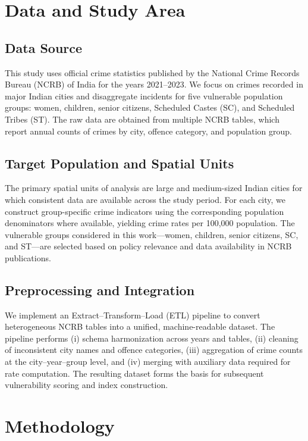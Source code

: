 \documentclass[conference]{IEEEtran}
\begin{document}
\section{Data and Study Area}

\subsection{Data Source}
This study uses official crime statistics published by the National Crime Records Bureau (NCRB) of India for the years 2021--2023. We focus on crimes recorded in major Indian cities and disaggregate incidents for five vulnerable population groups: women, children, senior citizens, Scheduled Castes (SC), and Scheduled Tribes (ST). The raw data are obtained from multiple NCRB tables, which report annual counts of crimes by city, offence category, and population group.

\subsection{Target Population and Spatial Units}
The primary spatial units of analysis are large and medium-sized Indian cities for which consistent data are available across the study period. For each city, we construct group-specific crime indicators using the corresponding population denominators where available, yielding crime rates per 100{,}000 population. The vulnerable groups considered in this work---women, children, senior citizens, SC, and ST---are selected based on policy relevance and data availability in NCRB publications.

\subsection{Preprocessing and Integration}
We implement an Extract--Transform--Load (ETL) pipeline to convert heterogeneous NCRB tables into a unified, machine-readable dataset. The pipeline performs (i) schema harmonization across years and tables, (ii) cleaning of inconsistent city names and offence categories, (iii) aggregation of crime counts at the city--year--group level, and (iv) merging with auxiliary data required for rate computation. The resulting dataset forms the basis for subsequent vulnerability scoring and index construction.

\section{Methodology}
\end{document}
